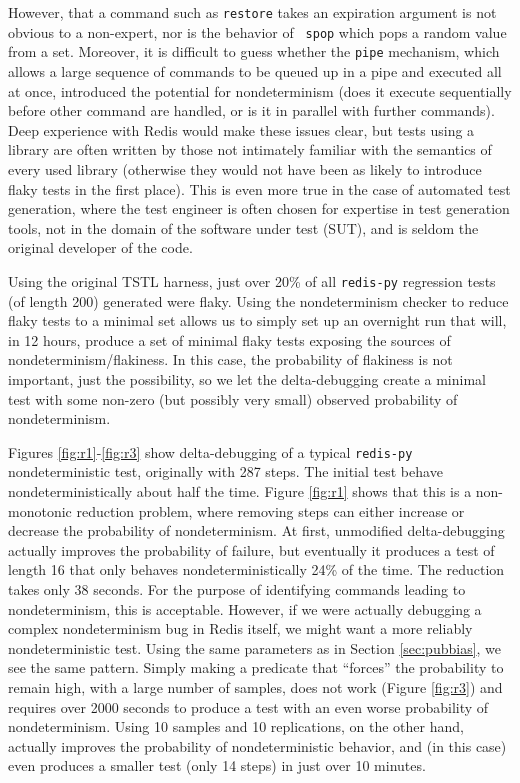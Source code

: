 However, that a command such as {\tt restore} takes an expiration
argument is not obvious to a non-expert, nor is the behavior of {\tt
  spop} which pops a random value from a set.  Moreover, it is
difficult to guess whether the {\tt pipe} mechanism, which allows a
large sequence of commands to be queued up in a pipe and executed all
at once, introduced the potential for nondeterminism (does it execute
sequentially before other command are handled, or is it in parallel
with further commands).  Deep experience with Redis would make these
issues clear, but tests using a library are often written by those not
intimately familiar with the semantics of every used library (otherwise they would not have
been as likely to introduce flaky tests in the first place).  This is
even more true in the case of automated test generation, where the
test engineer is often chosen for expertise in test generation tools,
not in the domain of the software under test (SUT), and is seldom the
original developer of the code.

Using the original TSTL harness, just over 20\% of all {\tt redis-py}
regression tests (of length 200) generated were flaky.  Using the
nondeterminism checker to reduce flaky tests to a minimal set allows
us to simply set up an overnight run that will, in 12 hours, produce
a set of minimal flaky tests exposing the sources of
nondeterminism/flakiness.  In this case, the probability of flakiness
is not important, just the possibility, so we let the delta-debugging
create a minimal test with some non-zero (but possibly very small)
observed probability of nondeterminism.

Figures \ref{fig:r1}-\ref{fig:r3} show delta-debugging of a typical
{\tt redis-py} nondeterministic test, originally with 287 steps.  The initial test behave
nondeterministically about half the time.  Figure \ref{fig:r1} shows
that this is a non-monotonic reduction problem, where removing steps
can either increase or decrease the probability of nondeterminism.  At
first, unmodified delta-debugging actually improves the probability of
failure, but eventually it produces a test of length 16 that only behaves
nondeterministically 24\% of the time.  The reduction takes only 38
seconds.  For the purpose of identifying commands leading to
nondeterminism, this is acceptable.  However, if we were actually
debugging a complex nondeterminism bug in Redis itself, we might want
a more reliably nondeterministic test.  Using the same parameters as
in Section \ref{sec:pubbias}, we see the same pattern.  Simply making
a predicate that ``forces'' the probability to remain high, with a
large number of samples, does not work (Figure \ref{fig:r3}) and
requires over 2000 seconds to produce a test with an even worse
probability of nondeterminism.  Using 10 samples and 10 replications,
on the other hand, actually improves the probability of
nondeterministic behavior, and
(in this case) even produces a smaller test (only 14 steps) in just
over 10 minutes.

